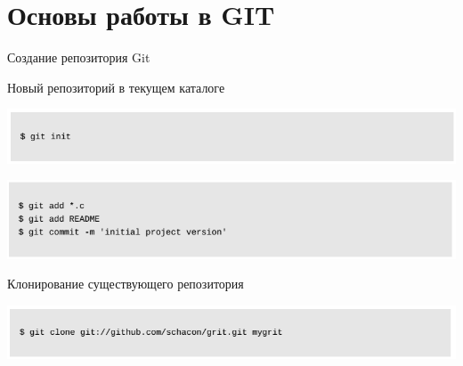 \documentclass{beamer}
\begin{document}
\section{Основы работы в GIT}
\begin{frame}{Создание репозитория Git}
\begin{block}{Новый репозиторий в текущем каталоге}
\begin{center}
\includegraphics[scale=0.55]{images/init-1.png}
\end{center}
\begin{center}
\includegraphics[scale=0.55]{images/init-2.png}
\end{center}
\end{block}
\begin{block}{Клонирование существующего репозитория}
\begin{center}
\includegraphics[scale=0.55]{images/init-3.png}
\end{center}
\end{block}
\end{frame}
\end{document}
